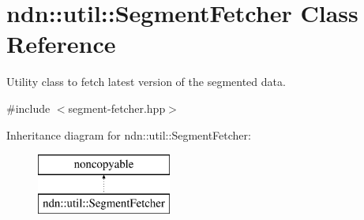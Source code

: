 \hypertarget{classndn_1_1util_1_1SegmentFetcher}{}\section{ndn\+:\+:util\+:\+:Segment\+Fetcher Class Reference}
\label{classndn_1_1util_1_1SegmentFetcher}


Utility class to fetch latest version of the segmented data.  




{\ttfamily \#include $<$segment-\/fetcher.\+hpp$>$}

Inheritance diagram for ndn\+:\+:util\+:\+:Segment\+Fetcher\+:\begin{figure}[H]
\begin{center}
\leavevmode
\includegraphics[height=2.000000cm]{classndn_1_1util_1_1SegmentFetcher}
\end{center}
\end{figure}
